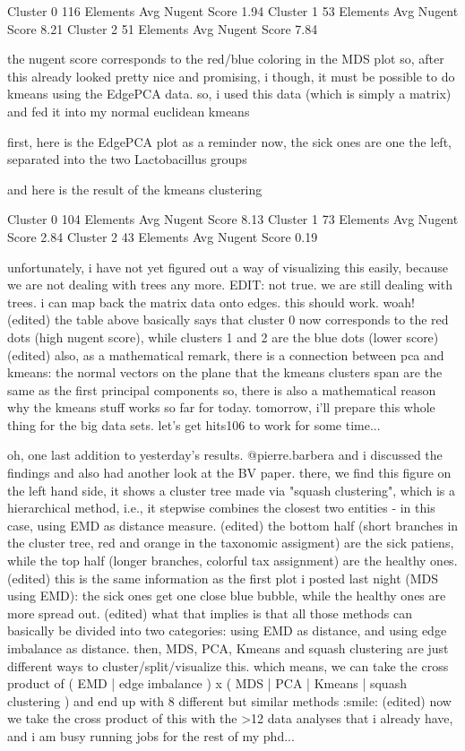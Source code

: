 Cluster 0    116 Elements  Avg Nugent Score 1.94
Cluster 1    53 Elements   Avg Nugent Score 8.21
Cluster 2    51 Elements   Avg Nugent Score 7.84

the nugent score corresponds to the red/blue coloring in the MDS plot
so, after this already looked pretty nice and promising, i though, it must be possible to do kmeans using the EdgePCA data. so, i used this data (which is simply a matrix) and fed it into my normal euclidean kmeans

first, here is the EdgePCA plot as a reminder
now, the sick ones are one the left, separated into the two Lactobacillus groups

and here is the result of the kmeans clustering

Cluster 0    104 Elements    Avg Nugent Score 8.13
Cluster 1    73 Elements     Avg Nugent Score 2.84
Cluster 2    43 Elements     Avg Nugent Score 0.19

unfortunately, i have not yet figured out a way of visualizing this easily, because we are not dealing with trees any more. EDIT: not true. we are still dealing with trees. i can map back the matrix data onto edges. this should work. woah! (edited)
the table above basically says that cluster 0 now corresponds to the red dots (high nugent score), while clusters 1 and 2 are the blue dots (lower score) (edited)
also, as a mathematical remark, there is a connection between pca and kmeans: the normal vectors on the plane that the kmeans clusters span are the same as the first principal components
so, there is also a mathematical reason why the kmeans stuff works
so far for today. tomorrow, i'll prepare this whole thing for the big data sets. let's get hits106 to work for some time...

oh, one last addition to yesterday's results. @pierre.barbera  and i discussed the findings and also had another look at the BV paper. there, we find this figure
on the left hand side, it shows a cluster tree made via "squash clustering", which is a hierarchical method, i.e., it stepwise combines the closest two entities - in this case, using EMD as distance measure. (edited)
the bottom half (short branches in the cluster tree, red and orange in the taxonomic assigment) are the sick patiens, while the top half (longer branches, colorful tax assignment) are the healthy ones. (edited)
this is the same information as the first plot i posted last night (MDS using EMD): the sick ones get one close blue bubble, while the healthy ones are more spread out. (edited)
what that implies is that all those methods can basically be divided into two categories: using EMD as distance, and using edge imbalance as distance. then, MDS, PCA, Kmeans and squash clustering are just different ways to cluster/split/visualize this. which means, we can take the cross product of ( EMD | edge imbalance ) x ( MDS | PCA | Kmeans | squash clustering ) and end up with 8 different but similar methods :smile: (edited)
now we take the cross product of this with the >12 data analyses that i already have, and i am busy running jobs for the rest of my phd...

